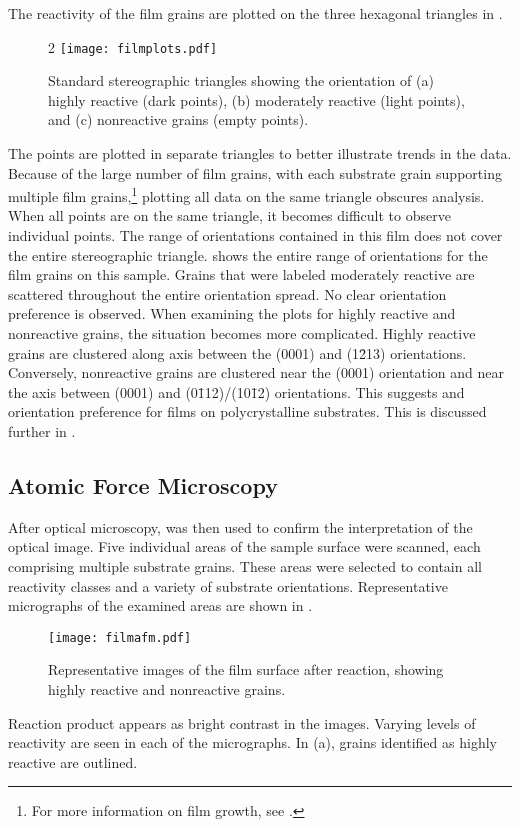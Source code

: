 The reactivity of the film grains are plotted on the three hexagonal triangles in . 
\begin{figure}2
	\texttt{[image: filmplots.pdf]}
		\caption[Orientation of film grains]{%
			Standard stereographic triangles showing the orientation
			of (a) highly reactive (dark points), (b) moderately reactive
			(light points), and (c) nonreactive grains (empty points).}
	\label{fig:filmplots}

\end{figure}
The points are plotted in separate triangles to better illustrate trends in the data. Because of the large number of film grains, with each substrate grain supporting multiple film grains,\footnote{For more information on film growth, see .} plotting all data on the same triangle obscures analysis. When all points are on the same triangle, it becomes difficult to observe individual points. The range of orientations contained in this film does not cover the entire stereographic triangle.  shows the entire range of orientations for the film grains on this sample. Grains that were labeled moderately reactive are scattered throughout the entire orientation spread. No clear orientation preference is observed. When examining the plots for highly reactive and nonreactive grains, the situation becomes more complicated. Highly reactive grains are clustered along axis between the (0001) and (1\={2}13) orientations. Conversely, nonreactive grains are clustered near the (0001) orientation and near the axis between (0001) and (0\={1}12)/(10\={1}2) orientations. This suggests and orientation preference for  films on polycrystalline  substrates. This is discussed further in .


\subsection{Atomic Force Microscopy}
\label{subsec:poly.reac.afm}


After optical microscopy,  was then used to confirm the interpretation of the optical image. Five individual areas of the sample surface were scanned, each comprising multiple substrate grains. These areas were selected to contain all reactivity classes and a variety of substrate orientations. Representative  micrographs of the examined areas are shown in .
\begin{figure}
\centering
	\texttt{[image: filmafm.pdf]}
		\caption[Representative  images of film]{%
			Representative  images of the film surface after
			reaction, showing highly reactive and nonreactive grains.}
	\label{fig:filmafm}
\end{figure}
Reaction product appears as bright contrast in the  images. Varying levels of reactivity are seen in each of the micrographs. In (a), grains identified as highly reactive are outlined.


